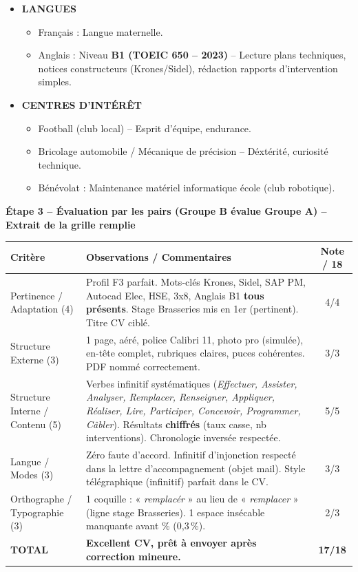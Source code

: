 \documentclass[11pt]{article}
\begin{document}
\begin{exoresolu}
\begin{itemize}
    \item \textbf{LANGUES}
    \begin{itemize}
        \item Français : Langue maternelle.
        \item Anglais : Niveau \textbf{B1 (TOEIC 650 -- 2023)} -- Lecture plans techniques, notices constructeurs (Krones/Sidel), rédaction rapports d'intervention simples.
    \end{itemize}
    
    \item \textbf{CENTRES D'INTÉRÊT}
    \begin{itemize}
        \item Football (club local) -- Esprit d'équipe, endurance.
        \item Bricolage automobile / Mécanique de précision -- Déxtérité, curiosité technique.
        \item Bénévolat : Maintenance matériel informatique école (club robotique).
    \end{itemize}
\end{itemize}

\textbf{Étape 3 -- Évaluation par les pairs (Groupe B évalue Groupe A) -- Extrait de la grille remplie}
\begin{center}
\begin{tabularx}{\linewidth}{|l|X|c|}\hline
\textbf{Critère} & \textbf{Observations / Commentaires} & \textbf{Note / 18} \\ \hline
Pertinence / Adaptation (4) & Profil F3 parfait. Mots-clés Krones, Sidel, SAP PM, Autocad Elec, HSE, 3x8, Anglais B1 \textbf{tous présents}. Stage Brasseries mis en 1er (pertinent). Titre CV ciblé. & 4/4 \\ \hline
Structure Externe (3) & 1 page, aéré, police Calibri 11, photo pro (simulée), en-tête complet, rubriques claires, puces cohérentes. PDF nommé correctement. & 3/3 \\ \hline
Structure Interne / Contenu (5) & Verbes infinitif systématiques (\emph{Effectuer, Assister, Analyser, Remplacer, Renseigner, Appliquer, Réaliser, Lire, Participer, Concevoir, Programmer, Câbler}). Résultats \textbf{chiffrés} (taux casse, nb interventions). Chronologie inversée respectée. & 5/5 \\ \hline
Langue / Modes (3) & Zéro faute d'accord. Infinitif d'injonction respecté dans la lettre d'accompagnement (objet mail). Style télégraphique (infinitif) parfait dans le CV. & 3/3 \\ \hline
Orthographe / Typographie (3) & 1 coquille : « \emph{remplacér} » au lieu de « \emph{remplacer} » (ligne stage Brasseries). 1 espace insécable manquante avant \% (0,3\,\%). & 2/3 \\ \hline
\textbf{TOTAL} & \textbf{Excellent CV, prêt à envoyer après correction mineure.} & \textbf{17/18} \\ \hline
\end{tabularx}
\end{center}


\end{exoresolu}
\end{document}
